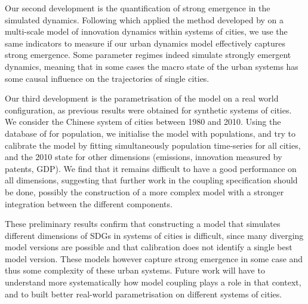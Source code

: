 \documentclass[11pt]{article}
\begin{document}
Our second development is the quantification of strong emergence in the simulated dynamics. Following \cite{raimbault2023innovation} which applied the method developed by \cite{rosas2020reconciling} on a multi-scale model of innovation dynamics within systems of cities, we use the same indicators to measure if our urban dynamics model effectively captures strong emergence. Some parameter regimes indeed simulate strongly emergent dynamics, meaning that in some cases the macro state of the urban systems has some causal influence on the trajectories of single cities.

Our third development is the parametrisation of the model on a real world configuration, as previous results were obtained for synthetic systems of cities. We consider the Chinese system of cities between 1980 and 2010. Using the database of \cite{swerts2017data} for population, we initialise the model with populations, and try to calibrate the model by fitting simultaneously population time-series for all cities, and the 2010 state for other dimensions (emissions, innovation measured by patents, GDP). We find that it remains difficult to have a good performance on all dimensions, suggesting that further work in the coupling specification should be done, possibly the construction of a more complex model with a stronger integration between the different components.

These preliminary results confirm that constructing a model that simulates different dimensions of SDGs in systems of cities is difficult, since many diverging model versions are possible and that calibration does not identify a single best model version. These models however capture strong emergence in some case and thus some complexity of these urban systems. Future work will have to understand more systematically how model coupling plays a role in that context, and to built better real-world parametrisation on different systems of cities.


\small


\end{document}
